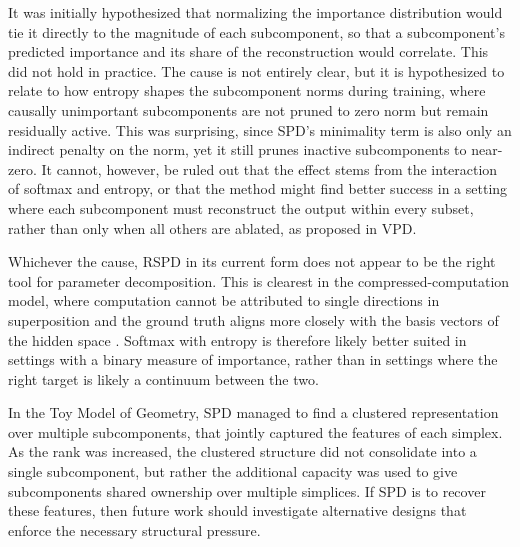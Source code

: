 \documentclass{article}
\begin{document}
It was initially hypothesized that normalizing the importance distribution would tie
it directly to the magnitude of each subcomponent, so that a subcomponent's predicted
importance and its share of the reconstruction would correlate. This did not hold
in practice. The cause is not
entirely clear, but it is hypothesized to relate to how entropy shapes
the subcomponent norms during training, where causally unimportant subcomponents
are not pruned to zero norm but remain residually active. 
This was surprising, since SPD's minimality term is also only
an indirect penalty on the norm, yet it still prunes
inactive subcomponents to near-zero. 
It cannot, however, be ruled out that the effect stems from the interaction
of softmax and entropy, or that the method might find better success in a
setting where each subcomponent must reconstruct the output within every subset,
rather than only when all others are ablated,
as proposed in VPD. \autocite{bushnaq2026interpreting_new_spd}

Whichever the cause, RSPD in its current form does not appear to be the
right tool for parameter decomposition. 
This is clearest in the compressed-computation model,
where computation cannot be attributed to single directions in
superposition and the ground truth aligns more closely with the basis
vectors of the hidden space \autocite{bhagat2025compressed,stochasticparameterdecomposition}.
Softmax with entropy is therefore likely better suited in settings
with a binary measure of importance, rather than in settings
where the right target is likely
a continuum between the two. \autocite{bushnaq2026interpreting_new_spd}

In the Toy Model of Geometry, SPD managed to find a clustered representation over
multiple subcomponents, that jointly captured the features of each simplex.
As the rank was increased, the clustered structure did not consolidate into a single subcomponent,
but rather the additional capacity was used to give subcomponents shared ownership over multiple simplices.
If SPD is to recover these features, then
future work should investigate alternative designs that enforce the necessary structural pressure.
\end{document}
